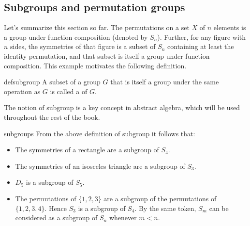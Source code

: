 \subsection{Subgroups and permutation groups}
\label{subsec:Permutations:GroupGeneralizations:SubgroupAndPermutationGroups}

Let's summarize this section so far.  The permutations on a set $X$ of $n$ elements is a group under function composition (denoted by  $S_n$).  Further, for any figure with $n$ sides, the symmetries of that figure is a subset of $S_n$ containing at least the identity permutation, and that subset is itself a group under function composition.  This example motivates the following definition.

\begin{defn}{defsubgroup}
A subset of a group $G$ that is itself a group under the same operation as $G$ is called a  of $G$.  
\end{defn}

The notion of subgroup is a key concept in abstract algebra, which will be used throughout the rest of the book.  

\begin{example}{subgroups}
From the above definition of subgroup it follows that:
\begin{itemize}
\item
The symmetries of a rectangle are a subgroup of $S_4$. 
\item
The symmetries of an isosceles triangle are a subgroup of $S_3$.
\item
$D_5$ is a subgroup of $S_5$.
\item
The permutations of $\{1,2,3\}$ are a subgroup of the permutations of $\{1,2,3,4\}$. Hence $S_3$ is a subgroup of $S_4$. By the same token, $S_m$ can be considered as a subgroup of $S_n$ whenever $m < n$.
\end{itemize}
\end{example}


